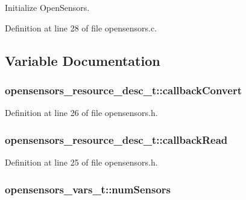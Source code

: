 Initialize Open\+Sensors. 



Definition at line 28 of file opensensors.\+c.



\subsection{Variable Documentation}
\subsubsection[{\texorpdfstring{callback\+Convert}{callbackConvert}}]{ opensensors\+\_\+resource\+\_\+desc\+\_\+t\+::callback\+Convert}\hypertarget{group___open_sensors_ga181017b594454ddb5e2346366984ee44}{}\label{group___open_sensors_ga181017b594454ddb5e2346366984ee44}


Definition at line 26 of file opensensors.\+h.

\subsubsection[{\texorpdfstring{callback\+Read}{callbackRead}}]{ opensensors\+\_\+resource\+\_\+desc\+\_\+t\+::callback\+Read}\hypertarget{group___open_sensors_ga1768cf6325dd5cd7caea6087f3b9f565}{}\label{group___open_sensors_ga1768cf6325dd5cd7caea6087f3b9f565}


Definition at line 25 of file opensensors.\+h.

\subsubsection[{\texorpdfstring{num\+Sensors}{numSensors}}]{ opensensors\+\_\+vars\+\_\+t\+::num\+Sensors}\hypertarget{group___open_sensors_gaec18c546c1947550d51927b99b225a10}{}\label{group___open_sensors_gaec18c546c1947550d51927b99b225a10}


